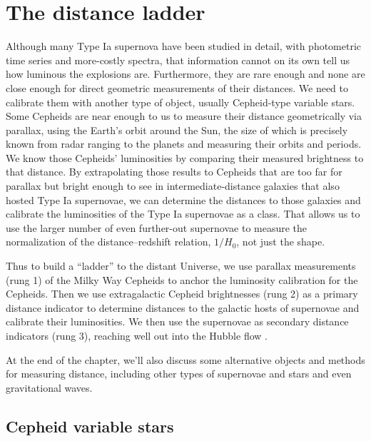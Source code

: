 \chapter{The distance ladder} \label{ch:distance_ladder}

Although many Type Ia supernova have been studied in detail, with photometric time series and more-costly spectra, that information cannot on its own tell us how luminous the explosions are.  Furthermore, they are rare enough and none are close enough for direct geometric measurements of their distances.  We need to calibrate them with another type of object, usually Cepheid-type variable stars.  Some Cepheids are near enough to us to measure their distance geometrically via parallax, using the Earth's orbit around the Sun, the size of which is precisely known from radar ranging to the planets and measuring their orbits and periods.  We know those Cepheids' luminosities by comparing their measured brightness to that distance.  By extrapolating those results to Cepheids that are too far for parallax but bright enough to see in intermediate-distance galaxies that also hosted Type Ia supernovae, we can determine the distances to those galaxies and calibrate the luminosities of the Type Ia supernovae as a class.  That allows us to use the larger number of even further-out supernovae to measure the normalization of the distance--redshift relation, $1/H_0$, not just the shape.

Thus to build a ``ladder'' to the distant Universe, we use parallax measurements (rung 1) of the Milky Way Cepheids to anchor the luminosity calibration for the Cepheids.  Then we use extragalactic Cepheid brightnesses (rung 2) as a primary distance indicator to determine distances to the galactic hosts of supernovae and calibrate their luminosities.  We then use the supernovae as secondary distance indicators (rung 3), reaching well out into the Hubble flow \citep[][]{2025arXiv251023823H}.  

At the end of the chapter, we'll also discuss some alternative objects and methods for measuring distance, including other types of supernovae and stars and even gravitational waves.
 

\section{Cepheid variable stars}

